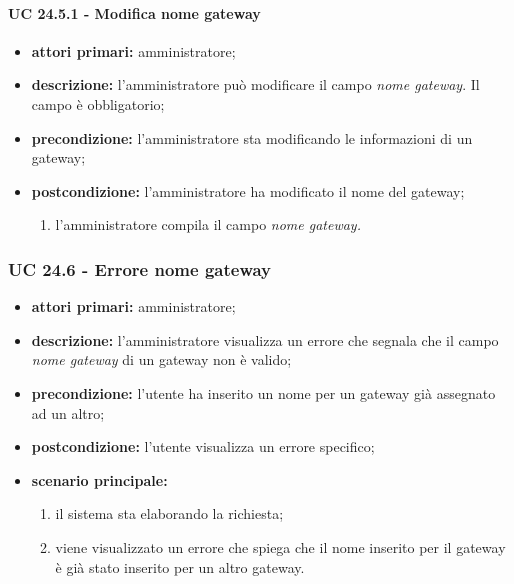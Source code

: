 				\paragraph{UC 24.5.1 - Modifica nome gateway}
				\begin{itemize}
					\item \textbf{attori primari:} amministratore;
					\item \textbf{descrizione:} l'amministratore può modificare il campo \textit{nome gateway}. Il campo è obbligatorio;
					\item \textbf{precondizione:} l'amministratore sta modificando le informazioni di un gateway;
					\item \textbf{postcondizione:} l'amministratore ha modificato il nome del gateway;
					\begin{enumerate}
						\item{l'amministratore compila il campo \textit{nome gateway.}}
					\end{enumerate} 
				\end{itemize}

			\subsubsection{UC 24.6 - Errore nome gateway}
			\begin{itemize}
				\item \textbf{attori primari:} amministratore;
				\item \textbf{descrizione:} l'amministratore visualizza un errore che segnala che il campo \textit{nome gateway} di un gateway non è valido;
				\item \textbf{precondizione:} l'utente ha inserito un nome per un gateway già assegnato ad un altro;
				\item \textbf{postcondizione:} l'utente visualizza un errore specifico;
				\item \textbf{scenario principale:}
				\begin{enumerate}
					\item il sistema sta elaborando la richiesta;
					\item viene visualizzato un errore che spiega che il nome inserito per il gateway è già stato inserito per un altro gateway.
				\end{enumerate}
			\end{itemize}

